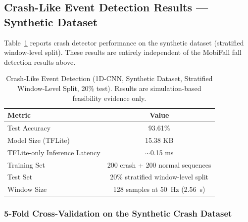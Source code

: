 \documentclass[12pt,a4paper]{article}
\begin{document}
\subsection{Crash-Like Event Detection Results --- Synthetic Dataset}
\label{sec:crash_results}

\begin{center}
\end{center}
\vspace{6pt}

Table~\ref{tab:crash_model} reports crash detector performance on the
synthetic dataset (stratified window-level split). These results are
entirely independent of the MobiFall fall detection results above.

\begin{table}[!ht]
\renewcommand{\arraystretch}{1.3}
\caption{Crash-Like Event Detection (1D-CNN, Synthetic Dataset, Stratified
Window-Level Split, 20\% test). Results are simulation-based feasibility
evidence only.}
\label{tab:crash_model}
\centering
\begin{tabular}{lc}
\toprule
\textbf{Metric} & \textbf{Value} \\
\midrule
Test Accuracy                  & 93.61\% \\
Model Size (TFLite)            & 15.38 KB \\
TFLite-only Inference Latency  & $\sim$0.15 ms \\
Training Set                   & 200 crash + 200 normal sequences \\
Test Set                       & 20\% stratified window-level split \\
Window Size                    & 128 samples at 50~Hz (2.56~s) \\
\bottomrule
\end{tabular}
\end{table}

\subsubsection*{5-Fold Cross-Validation on the Synthetic Crash Dataset}
\end{document}
